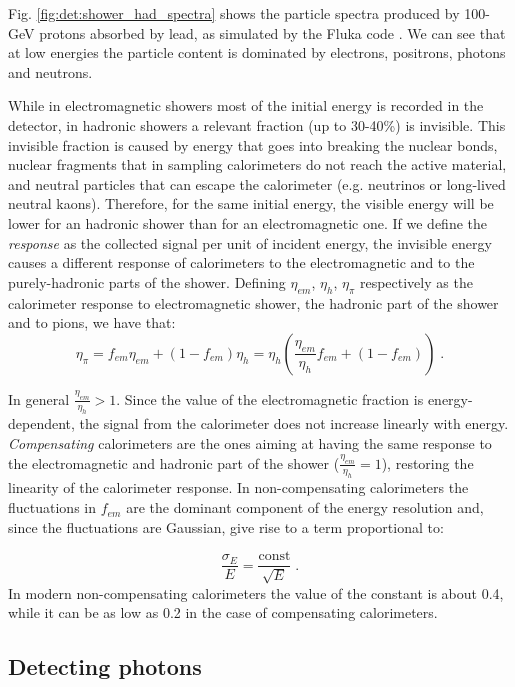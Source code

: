 Fig. \ref{fig:det:shower_had_spectra} shows the particle spectra produced by 100-GeV protons absorbed by lead, as simulated by the Fluka code \cite{Ferrari:898301}. We can see that at low energies the particle content is dominated by electrons, positrons, photons and neutrons.

While in electromagnetic showers most of the initial energy is recorded in the detector, in hadronic showers a relevant fraction (up to 30-40\%) is invisible. This invisible fraction is caused by energy that goes into breaking the nuclear bonds, nuclear fragments that in sampling calorimeters do not reach the active material, and neutral particles that can escape the calorimeter (e.g. neutrinos or long-lived neutral kaons). Therefore, for the same initial energy, the visible energy will be lower for an hadronic shower than for an electromagnetic one. If we define the \textit{response} as the collected signal per unit of incident energy, the invisible energy causes a different response of calorimeters to the electromagnetic and to the purely-hadronic parts of the shower. Defining $\eta_{em}$, $\eta_{h}$, $\eta_{\pi}$ respectively as the calorimeter response to electromagnetic shower, the hadronic part of the shower and to pions, we have that:
\begin{equation}
\eta_{\pi} = f_{em}\eta_{em} + (1-f_{em}) \eta_h = \eta_h \left( \frac{\eta_{em}}{\eta_{h}}f_{em} + (1-f_{em})  \right) \; .
\end{equation}

In general $\frac{\eta_{em}}{\eta_{h}}>1$. Since the value of the electromagnetic fraction is energy-dependent, the signal from the calorimeter does not increase linearly with energy. \textit{Compensating} calorimeters are the ones aiming at having the same response to the electromagnetic and hadronic part of the shower ($\frac{\eta_{em}}{\eta_{h}}=1$), restoring the linearity of the calorimeter response. In non-compensating calorimeters the fluctuations in $f_{em}$ are the dominant component of the energy resolution and, since the fluctuations are Gaussian, give rise to a term proportional to:

\begin{equation}
\frac{\sigma_E}{E} = \frac{\mathrm{const}}{\sqrt{E}}  \; .
\end{equation}
In modern non-compensating calorimeters the value of the constant is about 0.4, while it can be as low as 0.2 in the case of compensating calorimeters.


\subsection{Detecting photons}

